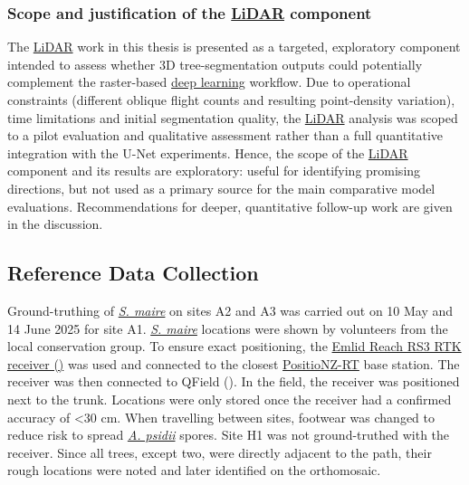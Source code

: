\documentclass[
]{scrreprt}
\begin{document}
\subsubsection{\texorpdfstring{Scope and justification of the
\hyperref[acronyms_LiDAR]{LiDAR}
component}{Scope and justification of the LiDAR component}}\label{scope-and-justification-of-the-component}

The \hyperref[acronyms_LiDAR]{LiDAR} work in this thesis is presented as
a targeted, exploratory component intended to assess whether 3D
tree-segmentation outputs could potentially complement the raster-based
\hyperref[acronyms_DL]{deep learning} workflow. Due to operational
constraints (different oblique flight counts and resulting point-density
variation), time limitations and initial segmentation quality, the
\hyperref[acronyms_LiDAR]{LiDAR} analysis was scoped to a pilot
evaluation and qualitative assessment rather than a full quantitative
integration with the U-Net experiments. Hence, the scope of the
\hyperref[acronyms_LiDAR]{LiDAR} component and its results are
exploratory: useful for identifying promising directions, but not used
as a primary source for the main comparative model evaluations.
Recommendations for deeper, quantitative follow-up work are given in the
discussion.

\subsection{Reference Data Collection}\label{reference-data-collection}

Ground-truthing of \hyperref[acronyms_SM]{\emph{S. maire}} on sites A2
and A3 was carried out on 10 May and 14 June 2025 for site A1.
\hyperref[acronyms_SM]{\emph{S. maire}} locations were shown by
volunteers from the local conservation group. To ensure exact
positioning, the \hyperref[acronyms_RS3]{Emlid Reach RS3 RTK receiver
()} was used and connected to
the closest \hyperref[acronyms_PositioNZ]{PositioNZ-RT} base station.
The receiver was then connected to QField
(). In the field, the receiver was
positioned next to the trunk. Locations were only stored once the
receiver had a confirmed accuracy of \textless30 cm. When travelling
between sites, footwear was changed to reduce risk to spread
\hyperref[acronyms_AP]{\emph{A. psidii}} spores. Site H1 was not
ground-truthed with the receiver. Since all trees, except two, were
directly adjacent to the path, their rough locations were noted and
later identified on the orthomosaic.
\end{document}
